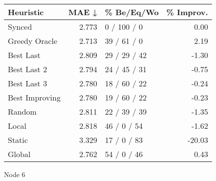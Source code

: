 \begin{tabular}{lrlr}
\toprule
\textbf{Heuristic} & \textbf{MAE ↓} & \textbf{\% Be/Eq/Wo} & \textbf{\% Improv.} \\
\midrule
            Synced &          2.773 &          0 / 100 / 0 &                0.00 \\
     Greedy Oracle &          2.713 &          39 / 61 / 0 &                2.19 \\
         Best Last &          2.809 &         29 / 29 / 42 &               -1.30 \\
       Best Last 2 &          2.794 &         24 / 45 / 31 &               -0.75 \\
       Best Last 3 &          2.780 &         18 / 60 / 22 &               -0.24 \\
    Best Improving &          2.780 &         19 / 60 / 22 &               -0.23 \\
            Random &          2.811 &         22 / 39 / 39 &               -1.35 \\
             Local &          2.818 &          46 / 0 / 54 &               -1.62 \\
            Static &          3.329 &          17 / 0 / 83 &              -20.03 \\
            Global &          2.762 &          54 / 0 / 46 &                0.43 \\
\bottomrule
\end{tabular}
\caption{Node 6}
\label{tab:hr_iid_lr05_le1_bs4_6}
